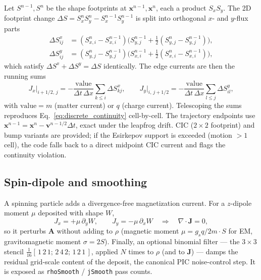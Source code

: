 \documentclass[11pt]{article}
\newcommand{\vv}[1]{\mathbf{#1}}           %
\newcommand{\dx}{\Delta x}                 %
\newcommand{\dt}{\Delta t}                 %
\begin{document}
Let $S^{n-1},S^{n}$ be the shape footprints at $\vv{x}^{n-1},\vv{x}^{n}$, each a
product $S_x S_y$. The 2D footprint change
$\Delta S=S^{n}_xS^{n}_y-S^{n-1}_xS^{n-1}_y$
is split into orthogonal $x$- and $y$-flux parts
\begin{align}
  \Delta S^{x}_{ij} &= (S^{n}_{x,i}-S^{n-1}_{x,i})\bigl(S^{n-1}_{y,j}+\tfrac12(S^{n}_{y,j}-S^{n-1}_{y,j})\bigr),\\
  \Delta S^{y}_{ij} &= (S^{n}_{y,j}-S^{n-1}_{y,j})\bigl(S^{n-1}_{x,i}+\tfrac12(S^{n}_{x,i}-S^{n-1}_{x,i})\bigr),
\end{align}
which satisfy $\Delta S^x+\Delta S^y=\Delta S$ identically. The edge currents are
then the running sums
\begin{equation}
\label{eq:esirkepov_J}
  J_{x}\big|_{i+1/2,\,j} = -\frac{\mathrm{value}}{\dt\,\dx}\sum_{k\le i}\Delta S^x_{kj},
  \qquad
  J_{y}\big|_{i,\,j+1/2} = -\frac{\mathrm{value}}{\dt\,\dx}\sum_{l\le j}\Delta S^y_{il},
\end{equation}
with $\mathrm{value}=m$ (matter current) or $q$ (charge current). Telescoping the
sums reproduces Eq.~\eqref{eq:discrete_continuity} cell-by-cell. The trajectory
endpoints use $\vv{x}^{n-1}=\vv{x}^n-\vv{v}^{n-1/2}\dt$, exact under the leapfrog
drift. CIC ($2{\times}2$ footprint) and bump variants are provided; if the
Esirkepov support is exceeded (motion $>1$ cell), the code falls back to a direct
midpoint CIC current and flags the continuity violation.

\subsection{Spin-dipole and smoothing}

A spinning particle adds a divergence-free magnetization current. For a
$z$-dipole moment $\mu$ deposited with shape $W$,
\begin{equation}
  J_x = +\mu\,\partial_y W,\qquad J_y = -\mu\,\partial_x W
  \quad\Rightarrow\quad \nabla\!\cdot\vv J = 0,
\end{equation}
so it perturbs $\vv A$ without adding to $\rho$ (magnetic moment
$\mu=g_s q/2m\cdot S$ for EM, gravitomagnetic moment $\sigma=2S$). Finally, an
optional binomial filter --- the $3{\times}3$ stencil
$\tfrac1{16}[\,1\,2\,1;\,2\,4\,2;\,1\,2\,1\,]$, applied $N$ times to $\rho$ (and
to $\vv J$) --- damps the residual grid-scale content of the deposit, the
canonical PIC noise-control step. It is exposed as \texttt{rhoSmooth} /
\texttt{jSmooth} pass counts.

\end{document}
